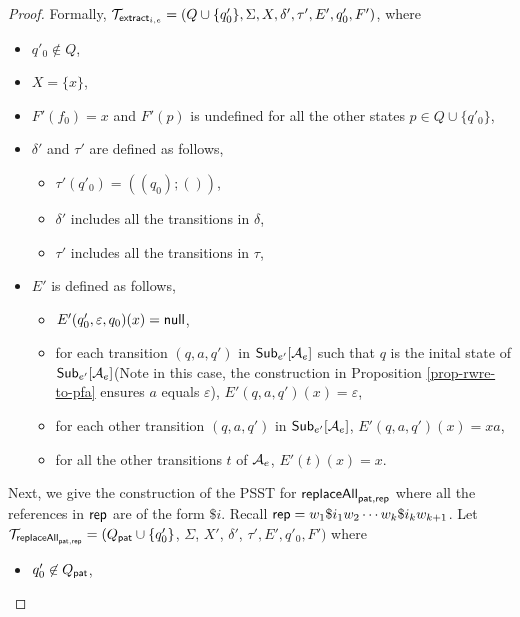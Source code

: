 \begin{proof}
        Formally, $\mathcal{T}_{\mathsf{extract}_{i,e}} = (Q \cup \{q'_0\}, \Sigma, X, \delta', \tau', E', q'_0, F')$, where
        \begin{itemize}
            \item $q'_0 \not \in Q$,
            \item $X = \{x\}$,
            \item $F'(f_0)= x$ and $F'(p)$ is undefined for all the other states $p \in Q  \cup \{q'_0\}$,
            \item $\delta'$ and $\tau'$ are defined as follows,
                \begin{itemize}
                    \item $\tau'(q'_0) = ((q_0); ())$,
                    \item $\delta'$ includes all the transitions in $\delta$,
                    \item $\tau'$ includes all the transitions in $\tau$,
                \end{itemize}
            \item $E'$ is defined as follows,
                \begin{itemize}
                    \item $E'(q'_0, \varepsilon, q_0)(x) = \mathsf{null}$,
                    \item for each transition $(q, a, q')$ in ${\sf Sub}_{e'}[\mathcal{A}_e]$ such that $q$ is the inital state of ${\sf Sub}_{e'}[\mathcal{A}_e]$(Note in this case, the construction in Proposition \ref{prop-rwre-to-pfa} ensures $a$ equals $\varepsilon$), $E'(q, a, q')(x) = \varepsilon$,
                    \item for each other transition $(q, a, q')$ in ${\sf Sub}_{e'}[\mathcal{A}_e]$, $E'(q, a, q')(x) = x a$,

                    \item for all the other transitions $t$ of $\mathcal{A}_e$, $E'(t)(x) = x$.
                \end{itemize}
        \end{itemize}

        Next, we give the construction of the PSST for $\mathsf{replaceAll}_{\mathsf{pat}, \mathsf{rep}}$ where all the references in $\mathsf{rep}$ are of the form $\$i$.
        Recall $\mathsf{rep} = w_1 \$i_1 w_2 \cdots w_k \$i_k w_{k+1}$.
        Let $\mathcal{T}_{\mathsf{replaceAll}_{\mathsf{pat}, \mathsf{rep}}} = (Q_{\mathsf{pat}} \cup \{q'_0\}$, $\Sigma$, $X'$, $\delta'$, $\tau', E', q'_0, F')$ where
        \begin{itemize}
            \item $q'_0 \not \in Q_{\mathsf{pat}}$,


\end{itemize}
\end{proof}

